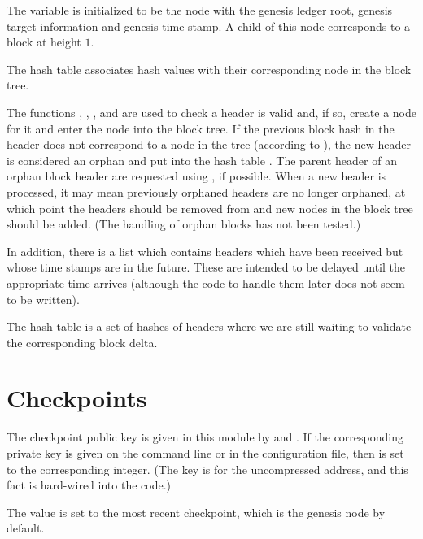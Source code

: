 The variable {} is initialized to be the node with the
genesis ledger root, genesis target information and genesis time stamp.
A child of this node corresponds to a block at height $1$.

The hash table {} associates hash values with their corresponding
node in the block tree.

The functions {},
{},
{},
{}
and {}
are used to check a header is valid and, if so, create
a node for it and enter the node into the block tree.
If the previous block hash in the header does not correspond
to a node in the tree (according to {}),
the new header is considered an orphan and put into
the hash table {}.
The parent header of an orphan block header are requested using {}, if possible.
When a new header is processed, it may mean previously orphaned headers are no longer orphaned,
at which point the headers should be removed from {}
and new nodes in the block tree should be added. (The handling of orphan blocks has not been tested.)

In addition, there is a list {} which contains headers which have
been received but whose time stamps are in the future. These are intended to be delayed until
the appropriate time arrives (although the code to handle them later does not seem to be written).

The hash table {} is a set of hashes of headers where we are still waiting to validate the corresponding block delta.

\section{Checkpoints}

The checkpoint public key is given in this module
by {}
and {}.
If the corresponding private key is given on the command line or in the configuration file,
then {} is set to the corresponding integer.
(The key is for the uncompressed address, and this fact is hard-wired into the code.)

The value {} is set to the most recent checkpoint, which is the
genesis node by default.

